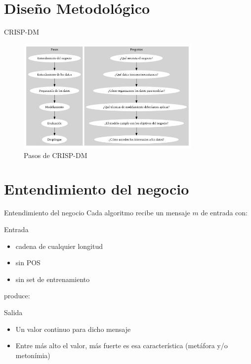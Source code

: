 \documentclass[presentation]{beamer}
\begin{document}
\section{Diseño Metodológico}
\label{sec:orge4eb685}

\begin{frame}[label={sec:org8acab85}]{CRISP-DM}
\begin{figure}
\caption{Pasos de CRISP-DM}
 \includegraphics[width=0.8\textwidth]{./assets/metodologia.png}

 \end{figure}
\end{frame}

\section{Entendimiento del negocio}
\label{sec:org0bb15ee}
\begin{frame}[label={sec:org5c314b8}]{Entendimiento del negocio}
Cada algoritmo recibe un mensaje  \(m\) de entrada con:
\begin{block}{Entrada}
\begin{itemize}
\item cadena de cualquier longitud
\item sin POS
\item sin set de entrenamiento
\end{itemize}
\end{block}
produce:

\begin{block}{Salida}
\begin{itemize}
\item  Un valor continuo para dicho mensaje 
\item  Entre más alto el valor, más fuerte es esa característica (metáfora y/o metonímia)
\end{itemize}
\end{block}
\end{frame}
\end{document}
